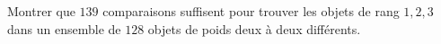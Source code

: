 Montrer que $139$ comparaisons suffisent pour trouver les objets de rang $1, 2, 3$ dans un ensemble de $128$ objets de poids deux à deux différents.
